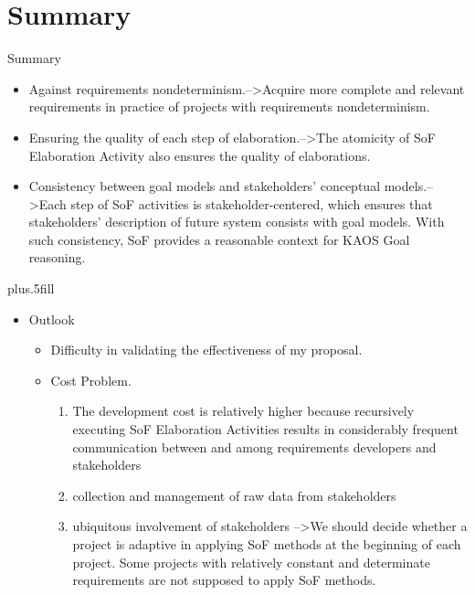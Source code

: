 \documentclass{beamer}
\begin{document}
 



\section*{Summary}
\begin{frame}{Summary}
  \tiny{
  \begin{itemize}
  \item
    Against requirements nondeterminism.-->Acquire more complete and relevant requirements in practice of projects with requirements nondeterminism.
  \item
    Ensuring the quality of each step of elaboration.-->The atomicity of SoF Elaboration Activity also ensures the quality of elaborations.
  \item 
    Consistency between goal models and stakeholders' conceptual models.-->Each step of SoF activities is stakeholder-centered, which ensures that stakeholders' description of future system consists with goal models. With such consistency, SoF provides a reasonable context for KAOS Goal reasoning.
  \end{itemize}
  }
  \vskip0pt plus.5fill
        \tiny{
          \begin{itemize}
  \item
    Outlook
    \begin{itemize}
    \item
      Difficulty in validating the effectiveness of my proposal.
    \item
      Cost Problem.
      \begin{enumerate}
      \item The development cost is relatively higher because recursively executing SoF Elaboration Activities results in considerably frequent communication between and among requirements developers and stakeholders
      \item collection and management of raw data from stakeholders
      \item ubiquitous involvement of stakeholders -->We should decide whether a project is adaptive in applying SoF methods at the beginning of each project. Some projects with relatively constant and determinate requirements are not supposed to apply SoF methods.
      \end{enumerate}
    \end{itemize}
  \end{itemize}
                }

\end{frame}
\end{document}
